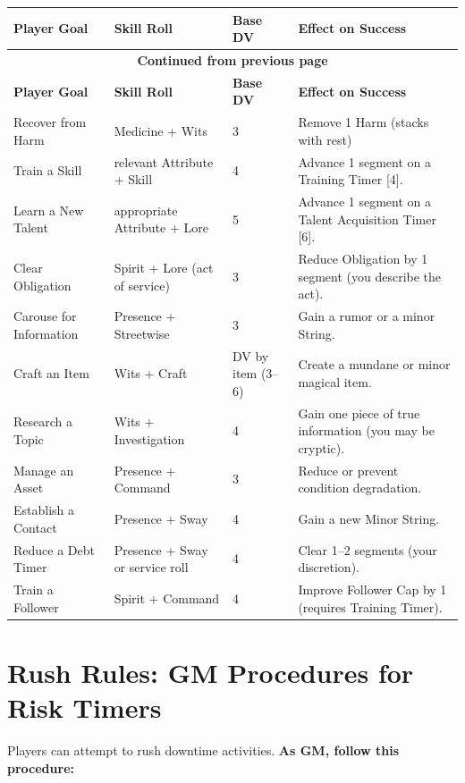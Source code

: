 \renewcommand{\arraystretch}{1.2}
\begin{longtable}{p{4cm}p{2.5cm}p{3cm}p{5cm}}
\toprule
\textbf{Player Goal} & \textbf{Skill Roll} & \textbf{Base DV} & \textbf{Effect on Success} \\
\midrule
\endfirsthead
\multicolumn{4}{c}{{\bfseries Continued from previous page}} \\
\toprule
\textbf{Player Goal} & \textbf{Skill Roll} & \textbf{Base DV} & \textbf{Effect on Success} \\
\midrule
\endhead
\bottomrule
\endfoot
Recover from Harm & Medicine + Wits & 3 & Remove 1 Harm (stacks with rest) \\
Train a Skill & relevant Attribute + Skill & 4 & Advance 1 segment on a Training Timer [4]. \\
Learn a New Talent & appropriate Attribute + Lore & 5 & Advance 1 segment on a Talent Acquisition Timer [6]. \\
Clear Obligation & Spirit + Lore (act of service) & 3 & Reduce Obligation by 1 segment (you describe the act). \\
Carouse for Information & Presence + Streetwise & 3 & Gain a rumor or a minor String. \\
Craft an Item & Wits + Craft & DV by item (3--6) & Create a mundane or minor magical item. \\
Research a Topic & Wits + Investigation & 4 & Gain one piece of true information (you may be cryptic). \\
Manage an Asset & Presence + Command & 3 & Reduce or prevent condition degradation. \\
Establish a Contact & Presence + Sway & 4 & Gain a new Minor String. \\
Reduce a Debt Timer & Presence + Sway or service roll & 4 & Clear 1--2 segments (your discretion). \\
Train a Follower & Spirit + Command & 4 & Improve Follower Cap by 1 (requires Training Timer). \\
\end{longtable}

\section{Rush Rules: GM Procedures for Risk Timers}
\label{sec:rush-rules}
Players can attempt to rush downtime activities. \textbf{As GM, follow this procedure:}  

